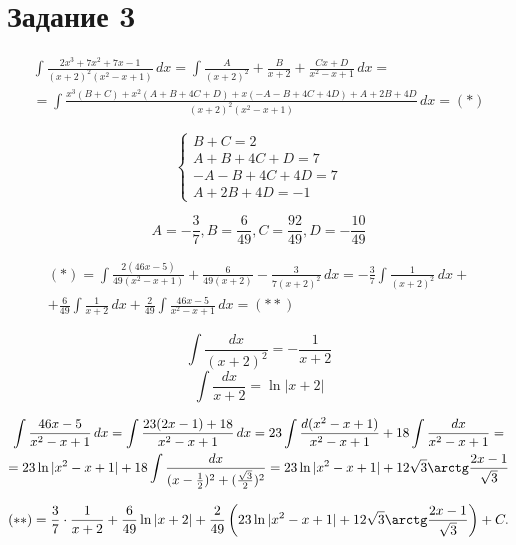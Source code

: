 \section{Задание 3}
\begin{multline*}
    \int \frac{2x^3+7x^2+7x-1}{(x+2)^2(x^2-x+1)} \, dx =
        \int \frac{A}{(x+2)^2}+\frac{B}{x+2}+\frac{C x+D}{x^2-x+1} \, dx = \\ =
        \int \frac{x^3 (B+C) + x^2 (A+B+4 C+D)+x (-A-B+4 C+4 D)+A+2 B+4
            D}{(x+2)^2 \left(x^2-x+1\right)} \, dx = (*)
\end{multline*}

\HRule

\[ 
\left\{ 
    \begin{array}{l}
        B + C = 2 \\
        A + B + 4 C + D = 7 \\
        -A - B + 4 C + 4 D = 7 \\
        A + 2 B + 4 D = -1
    \end{array}
\right.
\]

\[ A = -\frac{3}{7}, B = \frac{6}{49}, C = \frac{92}{49}, D = -\frac{10}{49} \]

\HRule

\begin{multline*}
    (*) = \int \frac{2 (46 x-5)}{49 \left(x^2-x+1\right)}+\frac{6}{49
            (x+2)}-\frac{3}{7 (x+2)^2} \, dx = 
        -\frac{3}{7} \int \frac{1}{(x+2)^2} \, dx + \\ + \frac{6}{49} \int
            \frac{1}{x+2} \, dx + 
            \frac{2}{49} \int \frac{46 x-5}{x^2-x+1}\, dx = (**)
\end{multline*}

\HRule

\[ \int \frac{dx}{(x+2)^2} = -\frac{1}{x+2} \]
\[ \int \frac{dx}{x+2} = \ln |x + 2| \]

\begin{multline*}
    \int \frac{46 x - 5}{x^2 - x + 1} \, dx = 
        \int \frac{23(2x-1)+18}{x^2-x+1} \, dx =
        23 \int \frac{d(x^2-x+1)}{x^2-x+1} + 18 \int \frac{dx}{x^2-x+1} = \\ =
        23 \ln |x^2 - x + 1| + 
            18 \int \frac{dx}{(x-\frac{1}{2})^2+(\frac{\sqrt{3}}{2})^2} = 
        23 \ln |x^2-x+1| + 12\sqrt{3}\arctg\frac{2x-1}{\sqrt{3}}
\end{multline*}

\HRule

\[ (**) = \frac{3}{7}\cdot\frac{1}{x+2} + \frac{6}{49} \ln|x+2| + 
    \frac{2}{49} \left( 23 \ln |x^2-x+1| + 12\sqrt{3}\arctg\frac{2x-1}{\sqrt{3}}
    \right) + C.
\]

